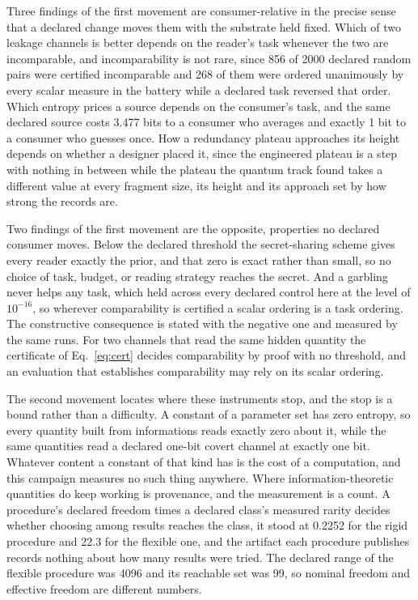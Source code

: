 \documentclass[aps,pre,reprint,nofootinbib]{revtex4-2}
\begin{document}
Three findings of the first movement are consumer-relative in the
precise sense that a declared change moves them with the substrate
held fixed.  Which of two leakage channels is better depends on the
reader's task whenever the two are incomparable, and incomparability
is not rare, since 856 of 2000 declared random pairs were certified
incomparable and 268 of them were ordered unanimously by every scalar
measure in the battery while a declared task reversed that order.
Which entropy prices a source depends on the consumer's task, and the
same declared source costs 3.477 bits to a consumer who averages and
exactly 1 bit to a consumer who guesses once.  How a redundancy
plateau approaches its height depends on whether a designer placed it,
since the engineered plateau is a step with nothing in between while
the plateau the quantum track found takes a different value at every
fragment size, its height and its approach set by how strong the
records are.

Two findings of the first movement are the opposite, properties no
declared consumer moves.  Below the declared threshold the
secret-sharing scheme gives every reader exactly the prior, and that
zero is exact rather than small, so no choice of task, budget, or
reading strategy reaches the secret.  And a garbling never helps any
task, which held across every declared control here at the level of
$10^{-16}$, so wherever comparability is certified a scalar ordering
is a task ordering.  The constructive consequence is stated with the
negative one and measured by the same runs.  For two channels that
read the same hidden quantity the certificate of Eq.~\eqref{eq:cert}
decides comparability by proof with no threshold, and an evaluation
that establishes comparability may rely on its scalar ordering.

The second movement locates where these instruments stop, and the stop
is a bound rather than a difficulty.  A constant of a parameter set
has zero entropy, so every quantity built from informations reads
exactly zero about it, while the same quantities read a declared
one-bit covert channel at exactly one bit.  Whatever content a
constant of that kind has is the cost of a computation, and this
campaign measures no such thing anywhere.  Where information-theoretic
quantities do keep working is provenance, and the measurement is a
count.  A procedure's declared freedom times a declared class's
measured rarity decides whether choosing among results reaches the
class, it stood at 0.2252 for the rigid procedure and 22.3 for the
flexible one, and the artifact each procedure publishes records
nothing about how many results were tried.  The declared range of the
flexible procedure was 4096 and its reachable set was 99, so nominal
freedom and effective freedom are different numbers.
\end{document}
